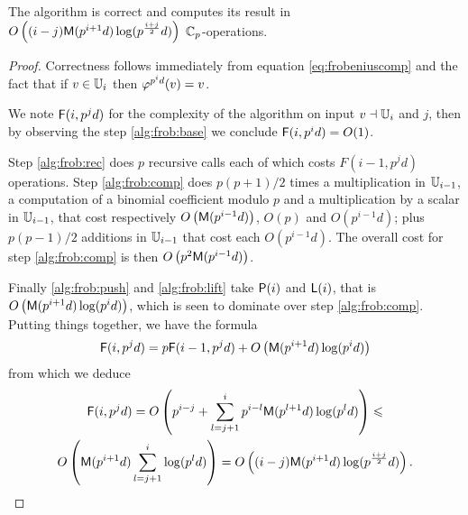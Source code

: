 \sloppy
\begin{theorem}
  \label{th:frob}
  The algorithm  is correct and computes
  its result in
  $O\left((i-j)\mathrm{\sf M}(p^{i+1}d)\log(p^{\frac{i+j}{2}}d)\right)$
  $\mathbb{C}_p$-operations.
\end{theorem}
\fussy
\begin{proof}
  Correctness follows immediately from equation
  \eqref{eq:frobeniuscomp} and the fact that if $v\in\mathbb{U}_i$ then
  $\varphi^{p^id}(v)=v$.

  We note $\mathrm{\sf F}(i,p^jd)$ for the complexity of the algorithm on input
  $v\dashv\mathbb{U}_i$ and $j$, then by observing the step \ref{alg:frob:base}
  we conclude $\mathrm{\sf F}(i,p^id) = O(1)$.
  
  Step \ref{alg:frob:rec} does $p$ recursive calls each of which costs
  $F(i-1, p^jd)$ operations. Step \ref{alg:frob:comp} does $p(p+1)/2$
  times a multiplication in $\mathbb{U}_{i-1}$, a computation of a binomial
  coefficient modulo $p$ and a multiplication by a scalar in
  $\mathbb{U}_{i-1}$, that cost respectively $O\left(\mathrm{\sf M}(p^{i-1}d)\right)$,
  $O(p)$ and $O\left(p^{i-1}d\right)$; plus $p(p-1)/2$ additions in
  $\mathbb{U}_{i-1}$ that cost each $O\left(p^{i-1}d\right)$. The overall cost
  for step \ref{alg:frob:comp} is then $O\left(p^2\mathrm{\sf M}(p^{i-1}d)\right)$.

  Finally \ref{alg:frob:push} and \ref{alg:frob:lift} take $\mathrm{\sf P}(i)$
  and $\mathrm{\sf L}(i)$, that is $O\left(\mathrm{\sf M}(p^{i+1}d)\log(p^id)\right)$,
  which is seen to dominate over step \ref{alg:frob:comp}. Putting
  things together, we have the formula
  \begin{equation*}
    \mathrm{\sf F}(i,p^jd) =
    p\mathrm{\sf F}(i-1,p^jd) + O\left(\mathrm{\sf M}(p^{i+1}d)\log(p^id)\right)
  \end{equation*}
  from which we deduce
  \begin{multline}
    \label{eq:F(i,j)}
    \mathrm{\sf F}(i,p^jd) = O\left(p^{i-j} + \sum_{l=j+1}^i
    p^{i-l}\mathrm{\sf M}(p^{l+1}d)\log(p^ld)\right) \leqslant\\
    O\left(\mathrm{\sf M}(p^{i+1}d)\sum_{l=j+1}^i\log(p^ld)\right) =
    O\left((i-j)\mathrm{\sf M}(p^{i+1}d)\log(p^{\frac{i+j}{2}}d)\right)
    \text{.}
  \end{multline}
\end{proof}

